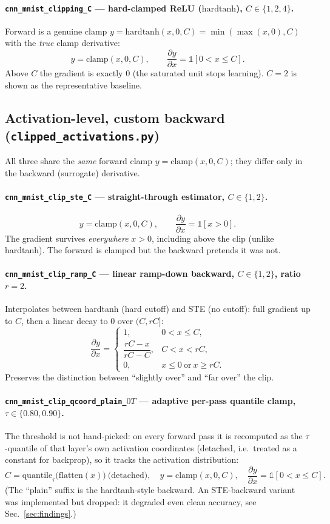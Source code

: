 \documentclass[11pt]{article}
\newcommand{\code}[1]{\texttt{#1}}
\begin{document}
\paragraph{\code{cnn\_mnist\_clipping\_C} --- hard-clamped ReLU ($\mathrm{hardtanh}$), $C\in\{1,2,4\}$.}
Forward is a genuine clamp $y=\mathrm{hardtanh}(x,0,C)=\min(\max(x,0),C)$ with the
\emph{true} clamp derivative:
\[
  y=\mathrm{clamp}(x,0,C),\qquad
  \frac{\partial y}{\partial x}=\mathbb{1}[0<x\le C].
\]
Above $C$ the gradient is exactly $0$ (the saturated unit stops learning). $C{=}2$ is
shown as the representative baseline.

\subsection{Activation-level, custom backward (\code{clipped\_activations.py})}
All three share the \emph{same} forward clamp $y=\mathrm{clamp}(x,0,C)$; they differ only in
the backward (surrogate) derivative.

\paragraph{\code{cnn\_mnist\_clip\_ste\_C} --- straight-through estimator, $C\in\{1,2\}$.}
\[
  y=\mathrm{clamp}(x,0,C),\qquad
  \frac{\partial y}{\partial x}=\mathbb{1}[x>0].
\]
The gradient survives \emph{everywhere} $x>0$, including above the clip (unlike hardtanh).
The forward is clamped but the backward pretends it was not.

\paragraph{\code{cnn\_mnist\_clip\_ramp\_C} --- linear ramp-down backward, $C\in\{1,2\}$, ratio $r=2$.}
Interpolates between hardtanh (hard cutoff) and STE (no cutoff): full gradient up to $C$,
then a linear decay to $0$ over $(C,rC]$:
\[
  \frac{\partial y}{\partial x}=
  \begin{cases}
    1, & 0<x\le C,\\[2pt]
    \dfrac{rC-x}{rC-C}, & C<x<rC,\\[6pt]
    0, & x\le 0 \ \text{or}\ x\ge rC.
  \end{cases}
\]
Preserves the distinction between ``slightly over'' and ``far over'' the clip.

\paragraph{\code{cnn\_mnist\_clip\_qcoord\_plain\_$0T$} --- adaptive per-pass quantile clamp, $\tau\in\{0.80,0.90\}$.}
The threshold is not hand-picked: on every forward pass it is recomputed as the
$\tau$-quantile of that layer's own activation coordinates (detached, i.e.\ treated as a
constant for backprop), so it tracks the activation distribution:
\[
  C=\mathrm{quantile}_\tau\!\big(\mathrm{flatten}(x)\big)\ \text{(detached)},\quad
  y=\mathrm{clamp}(x,0,C),\quad
  \frac{\partial y}{\partial x}=\mathbb{1}[0<x\le C].
\]
(The ``plain'' suffix is the hardtanh-style backward. An STE-backward variant was implemented
but dropped: it degraded even clean accuracy, see Sec.~\ref{sec:findings}.)
\end{document}
